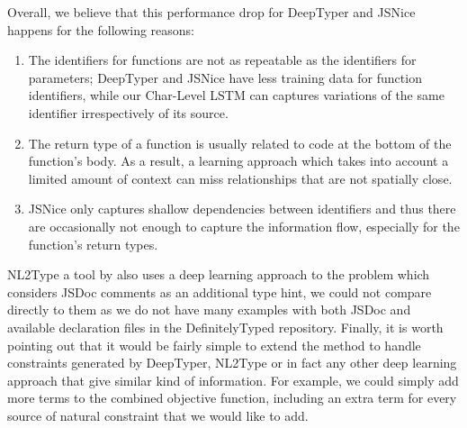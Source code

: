 \documentclass[sigplan,10pt,anonymous]{acmart} %
\newcommand{\prodts}{\textsc{ProdTS}\xspace}
\theoremstyle{plain}
\theoremstyle{remark}
\theoremstyle{definition}
\begin{document}
Overall, we believe that this performance drop for DeepTyper and JSNice happens for the following reasons:
\begin{enumerate}[label=(\roman*)]
  \item The identifiers for functions are not as repeatable as the identifiers for parameters; DeepTyper and JSNice have less training data for function identifiers, while our Char-Level LSTM can captures variations of the same identifier irrespectively of its source.
  \item The return type of a function is usually related to code at the bottom of the function's body.
        As a result, a learning approach which takes into account a limited amount of context can miss relationships that are not spatially close.
  \item JSNice only captures shallow dependencies between identifiers and thus there are occasionally not enough to capture the information flow, especially for the function's return types.
\end{enumerate}
NL2Type a tool by \cite{malik19} also uses
a deep learning approach to the problem which considers JSDoc comments as
an additional type hint, we could not compare directly to them as
we do not have many examples with both JSDoc and available declaration
files in the DefinitelyTyped repository.
Finally, it is worth pointing out that it would be fairly simple to extend the method to handle constraints generated by DeepTyper, NL2Type or
in fact any other deep learning approach that give similar kind of
information. For example, we could simply add more terms to the combined objective function, including an extra term for every source of natural constraint that we would like to add.
\end{document}
